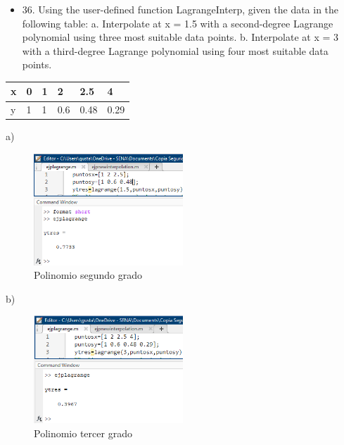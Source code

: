 \documentclass{article}
\begin{document}
\begin{itemize}
    \item 36. Using the user-defined function LagrangeInterp, given the
          data in the following table:
          \newline  a. Interpolate at x = 1.5 with a second-degree Lagrange polynomial
          using three most suitable data points.
          \newline  b. Interpolate at x = 3 with a third-degree Lagrange polynomial
          using four most suitable data points.
\end{itemize}\begin{table}[h!]
    \begin{tabular}{|l|l|l|l|l|l|}
        \hline
        \multicolumn{1}{|p{30.865313pt}}{\raggedright x} & \multicolumn{1}{|p{31.618126pt}}{\raggedright 0} & \multicolumn{1}{|p{31.618126pt}}{\raggedright 1} & \multicolumn{1}{|p{33.876564pt}}{\raggedright 2}   & \multicolumn{1}{|p{37.640625pt}}{\raggedright 2.5}  & \multicolumn{1}{|p{33.876564pt}|}{\raggedright 4}    \\
        \hline
        \multicolumn{1}{|p{30.865313pt}}{\raggedright y} & \multicolumn{1}{|p{31.618126pt}}{\raggedright 1} & \multicolumn{1}{|p{31.618126pt}}{\raggedright 1} & \multicolumn{1}{|p{33.876564pt}}{\raggedright 0.6} & \multicolumn{1}{|p{37.640625pt}}{\raggedright 0.48} & \multicolumn{1}{|p{33.876564pt}|}{\raggedright 0.29} \\
        \hline
    \end{tabular}
\end{table}
a)
\begin{figure}[H]
    \centering
    \includegraphics[width=0.5\textwidth]{36a.png}
    \caption[short]{Polinomio segundo grado}
\end{figure}
b)
\begin{figure}[H]
    \centering
    \includegraphics[width=0.5\textwidth]{36b.png}
    \caption[short]{Polinomio tercer grado}
\end{figure}
\end{document}
